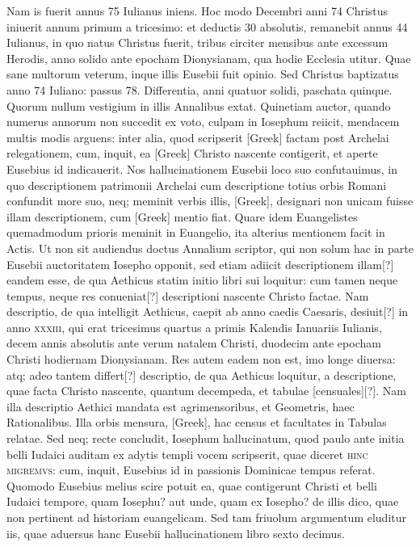 Nam is fuerit annus 75 Iulianus iniens.
Hoc modo Decembri anni 74 Christus iniuerit annum primum a tricesimo: et
deductis 30 absolutis, remanebit annus 44 Iulianus, in quo natus
Christus fuerit, tribus circiter mensibus ante excessum Herodis, anno
solido ante epocham Dionysianam, qua hodie Ecclesia utitur.
Quae sane multorum veterum, inque illis Eusebii fuit opinio.
Sed
Christus baptizatus anno 74 Iuliano: passus 78.
Differentia, anni
quatuor solidi, paschata quinque.
Quorum nullum vestigium in illis
Annalibus extat.
Quinetiam auctor, quando numerus annorum
non succedit ex voto, culpam in Iosephum reiicit, mendacem multis
modis arguens: inter alia, quod scripserit \textgreek{[Greek]} factam post
Archelai relegationem, cum, inquit, ea \textgreek{[Greek]} Christo nascente
contigerit, et aperte Eusebius id indicauerit.
Nos hallucinationem
Eusebii loco suo confutauimus, in quo descriptionem patrimonii
Archelai cum descriptione totius orbis Romani confundit more
suo, neq; meminit verbis illis, \textgreek{[Greek]}, designari non
unicam fuisse illam descriptionem, cum \textgreek{[Greek]} mentio fiat.
Quare
idem Euangelistes quemadmodum prioris meminit in Euangelio,
ita alterius mentionem facit in Actis.
Ut non sit audiendus doctus Annalium
scriptor, qui non solum hac in parte Eusebii auctoritatem
Iosepho opponit, sed etiam adiicit descriptionem illam[?] eandem esse,
de qua Aethicus statim initio libri sui loquitur: cum tamen neque
tempus, neque res conueniat[?] descriptioni nascente Christo factae.
Nam descriptio, de qua intelligit Aethicus, caepit ab anno caedis
Caesaris, desiuit[?] in anno \textsc{xxxiii},
 qui erat tricesimus quartus a primis
Kalendis Ianuariis Iulianis, decem annis absolutis ante verum
natalem Christi, duodecim ante epocham Christi hodiernam Dionysianam.
Res autem eadem non est, imo longe diuersa: atq; adeo
tantem differt[?] descriptio, de qua Aethicus loquitur, a descriptione,
quae facta Christo nascente, quantum decempeda, et tabulae [censuales][?].
Nam illa descriptio Aethici mandata est agrimensoribus, et
Geometris, haec Rationalibus.
Illa orbis mensura, \textgreek{[Greek]},
hac census et facultates in Tabulas relatae.
Sed neq; recte concludit,
Iosephum hallucinatum, quod paulo ante initia belli Iudaici
auditam ex adytis templi vocem scripserit, quae diceret \textsc{hinc
migremvs}: cum, inquit, Eusebius id in passionis Dominicae tempus
referat.
Quomodo Eusebius melius scire potuit ea, quae contigerunt
Christi et belli Iudaici tempore, quam Iosephu? aut unde,
quam ex Iosepho? de illis dico, quae non pertinent ad historiam euangelicam.
Sed tam friuolum argumentum eluditur iis, quae aduersus
hanc Eusebii hallucinationem libro sexto decimus.


